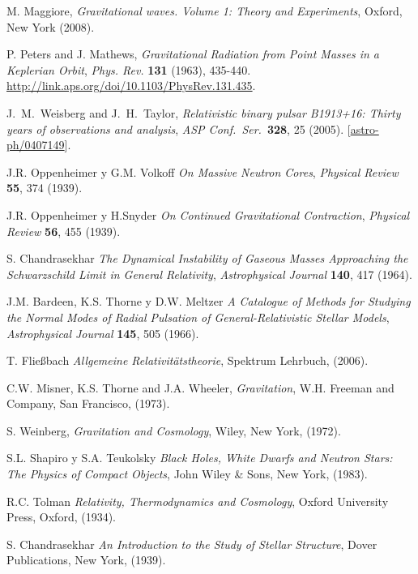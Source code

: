 \begin{thebibliography}{99}
 M. Maggiore,   \textit{Gravitational waves. Volume 1: Theory and Experiments}, Oxford, New York (2008).

P. Peters and J. Mathews,  \textit{Gravitational Radiation from Point Masses in a Keplerian Orbit},   \textsl{Phys. Rev.}   \textbf{131} (1963), 435-440. \url{http://link.aps.org/doi/10.1103/PhysRev.131.435}.

 J.~M.~Weisberg and J.~H.~Taylor,  \textit{Relativistic binary pulsar B1913+16: Thirty years of observations and analysis},   \textsl{ASP Conf.\ Ser.}\    \textbf{328}, 25 (2005). [\href{http://arxiv.org/abs/astro-ph/0407149}{astro-ph/0407149}].

 J.R. Oppenheimer y G.M. Volkoff  \textit{On Massive Neutron Cores},   \textsl{Physical Review}   \textbf{55}, 374 (1939).

 J.R. Oppenheimer y H.Snyder  \textit{On Continued Gravitational Contraction},   \textsl{Physical Review}   \textbf{56}, 455 (1939).

 S. Chandrasekhar  \textit{The Dynamical Instability of Gaseous Masses Approaching the Schwarzschild Limit in General Relativity},   \textsl{Astrophysical Journal}   \textbf{140}, 417 (1964).

 J.M. Bardeen, K.S. Thorne y D.W. Meltzer  \textit{A Catalogue of Methods for Studying the Normal Modes of Radial Pulsation of General-Relativistic Stellar Models},   \textsl{Astrophysical Journal}   \textbf{145}, 505 (1966).

 T. Flie\ss bach  \textit{Allgemeine Relativit\"atstheorie}, Spektrum Lehrbuch, (2006).

 C.W. Misner, K.S. Thorne and J.A. Wheeler,  \textit{Gravitation},
W.H. Freeman and Company, San Francisco, (1973).

 S. Weinberg,  \textit{Gravitation and Cosmology}, Wiley, New
York, (1972).

 S.L. Shapiro y S.A. Teukolsky  \textit{Black Holes, White Dwarfs and Neutron Stars: The Physics of Compact Objects}, John Wiley \& Sons, New York, (1983).

 R.C. Tolman  \textit{Relativity, Thermodynamics and Cosmology}, Oxford University Press, Oxford, (1934).

 S. Chandrasekhar  \textit{An Introduction to the Study of Stellar Structure}, Dover Publications, New York, (1939).



\end{thebibliography}
